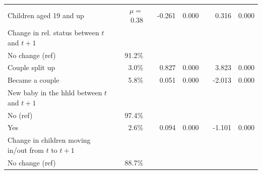 \begin{table}[H]
\begin{tabular}{lrrrrrrr}
		\hspace{2mm} Children aged 19 and up                   & $\mu = $ 0.38    &  & -0.261                   & 0.000                 &                      & 0.316                    & 0.000                 \\
		Change in rel. status between $t$ and $t + 1$ &         &  &                          &                       &                      &                          &                       \\
		\hspace{2mm} No change (ref)                           & 91.2\%  &  &                          &                       &                      &                          &                       \\
		\hspace{2mm} Couple split up                           & 3.0\%   &  & 0.827                    & 0.000                 &                      & 3.823                    & 0.000                 \\
		\hspace{2mm} Became a couple                           & 5.8\%   &  & 0.051                    & 0.000                 &                      & -2.013                   & 0.000                 \\
		New baby in the hhld between $t$ and $t + 1$            &         &  &                          &                       &                      &                          &                       \\
		\hspace{2mm} No (ref)                                  & 97.4\%  &  &                          &                       &                      &                          &                       \\
		\hspace{2mm} Yes                                       & 2.6\%   &  & 0.094                    & 0.000                 &                      & -1.101                   & 0.000                 \\
		Change in children moving in/out from $t$ to $t + 1$        &         &  &                          &                       &                      &                          &                       \\
		\hspace{2mm} No change (ref)                   & 88.7\%  &  &                          &                       &                      &                          &                       \\

\end{tabular}
\end{table}
